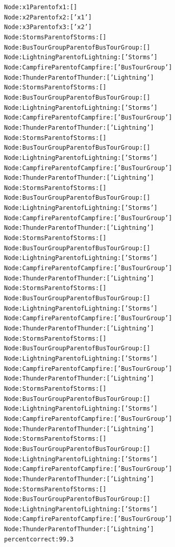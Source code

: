 \begin{shaded}
\scriptsize
\begin{alltt}
Node : x1   Parent of x1 : []
Node : x2   Parent of x2 : ['x1']
Node : x3   Parent of x3 : ['x2']
Node : Storms   Parent of Storms : []
Node : BusTourGroup   Parent of BusTourGroup : []
Node : Lightning  Parent of Lightning : ['Storms']
Node : Campfire   Parent of Campfire : ['BusTourGroup']
Node : Thunder  Parent of Thunder : ['Lightning']
Node : Storms   Parent of Storms : []
Node : BusTourGroup   Parent of BusTourGroup : []
Node : Lightning  Parent of Lightning : ['Storms']
Node : Campfire   Parent of Campfire : ['BusTourGroup']
Node : Thunder  Parent of Thunder : ['Lightning']
Node : Storms   Parent of Storms : []
Node : BusTourGroup   Parent of BusTourGroup : []
Node : Lightning  Parent of Lightning : ['Storms']
Node : Campfire   Parent of Campfire : ['BusTourGroup']
Node : Thunder  Parent of Thunder : ['Lightning']
Node : Storms   Parent of Storms : []
Node : BusTourGroup   Parent of BusTourGroup : []
Node : Lightning  Parent of Lightning : ['Storms']
Node : Campfire   Parent of Campfire : ['BusTourGroup']
Node : Thunder  Parent of Thunder : ['Lightning']
Node : Storms   Parent of Storms : []
Node : BusTourGroup   Parent of BusTourGroup : []
Node : Lightning  Parent of Lightning : ['Storms']
Node : Campfire   Parent of Campfire : ['BusTourGroup']
Node : Thunder  Parent of Thunder : ['Lightning']
Node : Storms   Parent of Storms : []
Node : BusTourGroup   Parent of BusTourGroup : []
Node : Lightning  Parent of Lightning : ['Storms']
Node : Campfire   Parent of Campfire : ['BusTourGroup']
Node : Thunder  Parent of Thunder : ['Lightning']
Node : Storms   Parent of Storms : []
Node : BusTourGroup   Parent of BusTourGroup : []
Node : Lightning  Parent of Lightning : ['Storms']
Node : Campfire   Parent of Campfire : ['BusTourGroup']
Node : Thunder  Parent of Thunder : ['Lightning']
Node : Storms   Parent of Storms : []
Node : BusTourGroup   Parent of BusTourGroup : []
Node : Lightning  Parent of Lightning : ['Storms']
Node : Campfire   Parent of Campfire : ['BusTourGroup']
Node : Thunder  Parent of Thunder : ['Lightning']
Node : Storms   Parent of Storms : []
Node : BusTourGroup   Parent of BusTourGroup : []
Node : Lightning  Parent of Lightning : ['Storms']
Node : Campfire   Parent of Campfire : ['BusTourGroup']
Node : Thunder  Parent of Thunder : ['Lightning']
Node : Storms   Parent of Storms : []
Node : BusTourGroup   Parent of BusTourGroup : []
Node : Lightning  Parent of Lightning : ['Storms']
Node : Campfire   Parent of Campfire : ['BusTourGroup']
Node : Thunder  Parent of Thunder : ['Lightning']
percent correct: 99.3%
\end{alltt}
\small
\end{shaded}

